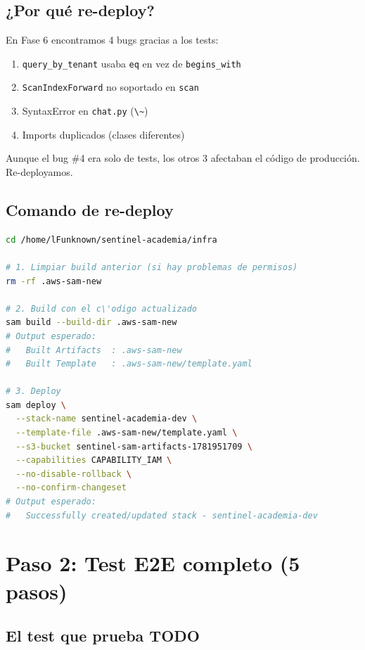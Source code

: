 \documentclass[11pt,a4paper,oneside]{article}
\begin{document}
\subsection{¿Por qu\'e re-deploy?}

En Fase 6 encontramos 4 bugs gracias a los tests:
\begin{enumerate}
  \item \texttt{query\_by\_tenant} usaba \texttt{eq} en vez de \texttt{begins\_with}
  \item \texttt{ScanIndexForward} no soportado en \texttt{scan}
  \item SyntaxError en \texttt{chat.py} (\texttt{\textbackslash{}\~{}})
  \item Imports duplicados (clases diferentes)
\end{enumerate}

Aunque el bug \#4 era solo de tests, los otros 3 afectaban el c\'odigo de producci\'on. Re-deployamos.

\subsection{Comando de re-deploy}

\begin{lstlisting}[language=bash,caption={Re-deploy con todos los fixes}]
cd /home/lFunknown/sentinel-academia/infra

# 1. Limpiar build anterior (si hay problemas de permisos)
rm -rf .aws-sam-new

# 2. Build con el c\'odigo actualizado
sam build --build-dir .aws-sam-new
# Output esperado:
#   Built Artifacts  : .aws-sam-new
#   Built Template   : .aws-sam-new/template.yaml

# 3. Deploy
sam deploy \
  --stack-name sentinel-academia-dev \
  --template-file .aws-sam-new/template.yaml \
  --s3-bucket sentinel-sam-artifacts-1781951709 \
  --capabilities CAPABILITY_IAM \
  --no-disable-rollback \
  --no-confirm-changeset
# Output esperado:
#   Successfully created/updated stack - sentinel-academia-dev
\end{lstlisting}

\section{Paso 2: Test E2E completo (5 pasos)}

\subsection{El test que prueba TODO}
\end{document}
